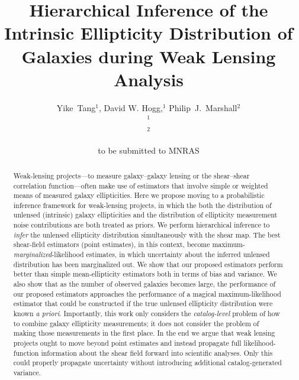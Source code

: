 \documentclass[useAMS,usenatbib]{mn2e}
\title[Hierarchical Inference in Weak Lensing]
{Hierarchical Inference of the Intrinsic Ellipticity
Distribution of Galaxies during Weak Lensing Analysis}
\author[Tang et al]{%
  Yike~Tang$^{1}$,
  David W. Hogg,$^{1}$
  Philip~J.~Marshall$^{2}$
  \medskip\\
  $^1$\nyu\\
  $^2$\oxford
}
\begin{document}
             
\date{to be submitted to MNRAS}
             
\pagerange{\pageref{firstpage}--\pageref{lastpage}}

\maketitle           

\label{firstpage}


\begin{abstract}
Weak-lensing projects---to measure galaxy--galaxy lensing or the shear--shear
correlation function---often make use of estimators that involve simple or weighted
means of measured galaxy ellipticities.  Here we propose moving to a probabilistic inference
framework for weak-lensing projects, in which the both the distribution of unlensed
(intrinsic) galaxy ellipticities and the distribution of ellipticity measurement noise contributions
are both treated as priors.  We perform hierarchical inference to \emph{infer} the
unlensed ellipticity distribution simultaneously with the shear map.  The best
shear-field estimators (point estimates), in this context, become
maximum-\emph{marginalized}-likelihood estimates, in which uncertainty about the
inferred unlensed distribution has been marginalized out.  We show that our proposed
estimators perform better than simple mean-ellipticity estimators both in terms of
bias and variance.  We also show that as the number of observed galaxies becomes
large, the performance of our proposed estimators approaches the performance of a
magical maximum-likelihood estimator that could be constructed if the true unlensed
ellipticity distribution were known \textit{a priori}.  Importantly, this work only
considers the \emph{catalog-level} problem of how to combine galaxy ellipticity
measurements; it does not consider the problem of making those measurements in the
first place.  In the end we argue that weak lensing projects ought to move beyond
point estimates and instead propagate full likelihood-function information about
the shear field forward into scientific analyses.  Only this could properly
propagate uncertainty without introducing additional catalog-generated variance.
\end{abstract}

\end{document}
